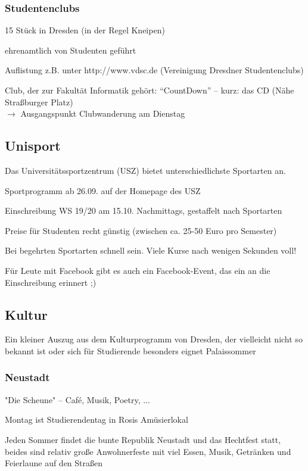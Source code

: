 \documentclass[a4paper,12pt]{report}
\begin{document}
\subsubsection{Studentenclubs}
\begin{itemize*}
	\item 15 Stück in Dresden (in der Regel Kneipen)
	\item ehrenamtlich von Studenten geführt
	\item Auflistung z.B. unter http://www.vdsc.de (Vereinigung Dresdner Studentenclubs)
	\item Club, der zur Fakultät Informatik gehört: \enquote{CountDown} -- kurz: das CD (Nähe Straßburger Platz)\\
	$\rightarrow$ Ausgangspunkt Clubwanderung am Dienstag
\end{itemize*}

\subsection{Unisport}
\begin{itemize*}
	\item Das Universitätssportzentrum (USZ) bietet unterschiedlichste Sportarten an.
	\item Sportprogramm ab 26.09. auf der Homepage des USZ
	\item Einschreibung WS 19/20 am 15.10. Nachmittags, gestaffelt nach Sportarten
	\item Preise für Studenten recht günstig (zwischen ca. 25-50 Euro pro Semester)
	\item Bei begehrten Sportarten schnell sein. Viele Kurse nach wenigen Sekunden voll!
	\item Für Leute mit Facebook gibt es auch ein Facebook-Event, das ein an die Einschreibung erinnert ;)
\end{itemize*}

\subsection{Kultur}
Ein kleiner Auszug aus dem Kulturprogramm von Dresden, der vielleicht nicht so bekannt ist oder sich für Studierende besonders eignet
Palaissommer

\subsubsection{Neustadt}
\begin{itemize*}
	\item "Die Scheune" -- Café, Musik, Poetry, ...
	\item Montag ist Studierendentag in Rosis Amüsierlokal
	\item Jeden Sommer findet die bunte Republik Neustadt und das Hechtfest statt, beides sind relativ große Anwohnerfeste mit viel Essen, Musik, Getränken und Feierlaune auf den Straßen
\end{itemize*}
\end{document}
